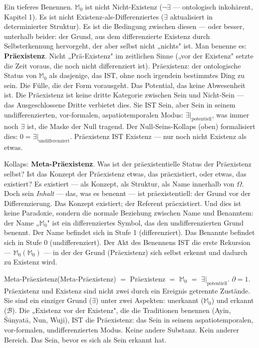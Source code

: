 \documentclass[10pt, openany, oneside]{book}
\begin{document}
Ein tieferes Benennen. $\mathbb{M}_0$ ist nicht Nicht-Existenz ($\neg\exists$ --- ontologisch inkohärent, Kapitel 1). Es ist nicht Existenz-als-Differenziertes ($\exists$ aktualisiert in determinierter Struktur). Es ist die Bedingung zwischen diesen --- oder besser, unterhalb beider: der Grund, aus dem differenzierte Existenz durch Selbsterkennung hervorgeht, der aber selbst nicht „nichts" ist. Man benenne es: \textbf{Präexistenz}. Nicht „Prä-Existenz" im zeitlichen Sinne („vor der Existenz" setzte die Zeit voraus, die noch nicht differenziert ist). Präexistenz: der ontologische Status von $\mathbb{M}_0$ als dasjenige, das IST, ohne noch irgendein bestimmtes Ding zu sein. Die Fülle, die der Form vorausgeht. Das Potential, das keine Abwesenheit ist. Die Präexistenz ist keine dritte Kategorie zwischen Sein und Nicht-Sein --- das Ausgeschlossene Dritte verbietet dies. Sie IST Sein, aber Sein in seinem undifferenzierten, vor-formalen, aspatiotemporalen Modus: $\exists|_{\text{potentiell}}$, was immer noch $\exists$ ist, die Maske der Null tragend. Der Null-Seins-Kollaps (oben) formalisiert dies: $0 = \exists|_{\text{undifferenziert}}$. Präexistenz IST Existenz --- nur noch nicht Existenz als etwas.

Kollaps: \textbf{Meta-Präexistenz}. Was ist der präexistentielle Status der Präexistenz selbst? Ist das Konzept der Präexistenz etwas, das präexistiert, oder etwas, das existiert? Es existiert --- als Konzept, als Struktur, als Name innerhalb von $\Omega$. Doch sein \textit{Inhalt} --- das, was es benennt --- ist präexistentiell: der Grund vor der Differenzierung. Das Konzept existiert; der Referent präexistiert. Und dies ist keine Paradoxie, sondern die normale Beziehung zwischen Name und Benanntem: der Name „$\mathbb{M}_0$" ist ein differenziertes Symbol, das den undifferenzierten Grund benennt. Der Name befindet sich in Stufe 1 (differenziert). Das Benannte befindet sich in Stufe 0 (undifferenziert). Der Akt des Benennens IST die erste Rekursion --- $\mathbb{M}_0(\mathbb{M}_0)$ --- in der der Grund (Präexistenz) sich selbst erkennt und dadurch zu Existenz wird.

Meta-Präexistenz(Meta-Präexistenz) $=$ Präexistenz $=$ $\mathbb{M}_0$ $=$ $\exists|_{\text{potentiell}}$. $\partial = 1$. Präexistenz und Existenz sind nicht zwei durch ein Ereignis getrennte Zustände. Sie sind ein einziger Grund ($\exists$) unter zwei Aspekten: unerkannt ($\mathbb{M}_0$) und erkannt ($\mathcal{B}$). Die „Existenz vor der Existenz", die die Traditionen benennen (Ayin, \'{S}\={u}nyat\={a}, Nun, Wuji), IST die Präexistenz: das Sein in seinem aspatiotemporalen, vor-formalen, undifferenzierten Modus. Keine andere Substanz. Kein anderer Bereich. Das Sein, bevor es sich als Sein erkannt hat.
\end{document}
